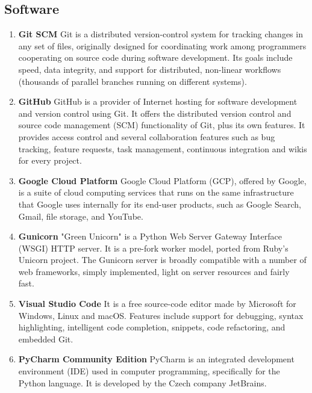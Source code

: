 \documentclass[12pt, a4paper]{report}
\begin{document}
    \subsection{Software}
    \begin{enumerate}
        \item \textbf{Git SCM} \newline
        Git is a distributed version-control system for tracking changes in any set of files, originally designed for coordinating work among programmers cooperating on source code during software development. Its goals include speed, data integrity, and support for distributed, non-linear workflows (thousands of parallel branches running on different systems).
        \item \textbf{GitHub} \newline
        GitHub is a provider of Internet hosting for software development and version control using Git. It offers the distributed version control and source code management (SCM) functionality of Git, plus its own features. It provides access control and several collaboration features such as bug tracking, feature requests, task management, continuous integration and wikis for every project.
        \item \textbf{Google Cloud Platform} \newline
        Google Cloud Platform (GCP), offered by Google, is a suite of cloud computing services that runs on the same infrastructure that Google uses internally for its end-user products, such as Google Search, Gmail, file storage, and YouTube.
        \item \textbf{Gunicorn} \newline
        "Green Unicorn" is a Python Web Server Gateway Interface (WSGI) HTTP server. It is a pre-fork worker model, ported from Ruby's Unicorn project. The Gunicorn server is broadly compatible with a number of web frameworks, simply implemented, light on server resources and fairly fast.
        \item \textbf{Visual Studio Code} \newline
        It is a free source-code editor made by Microsoft for Windows, Linux and macOS. Features include support for debugging, syntax highlighting, intelligent code completion, snippets, code refactoring, and embedded Git.
        \item \textbf{PyCharm Community Edition} \newline
        PyCharm is an integrated development environment (IDE) used in computer programming, specifically for the Python language. It is developed by the Czech company JetBrains.

\end{enumerate}
\end{document}
